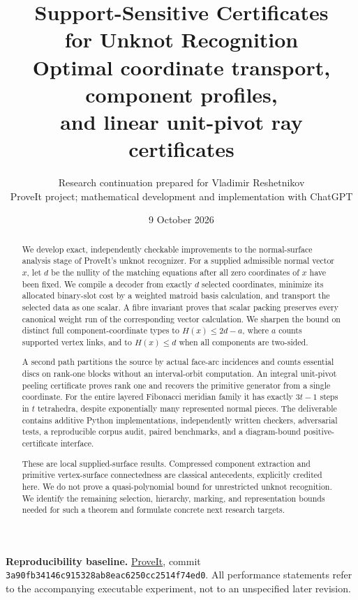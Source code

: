 \documentclass[11pt,a4paper]{article}
\title{\textcolor{ink}{Support-Sensitive Certificates\\for Unknot Recognition}\\[6pt]
 \large Optimal coordinate transport, component profiles,\\and linear unit-pivot ray certificates}
\author{Research continuation prepared for Vladimir Reshetnikov\\
 \small ProveIt project; mathematical development and implementation with ChatGPT}
\date{9 October 2026}
\theoremstyle{definition}
\newcommand{\code}[1]{{\small\nolinkurl{#1}}}
\begin{document}
\maketitle
\begin{abstract}
We develop exact, independently checkable improvements to the normal-surface
analysis stage of ProveIt's unknot recognizer.  For a supplied admissible normal
vector $x$, let $d$ be the nullity of the matching equations after all zero
coordinates of $x$ have been fixed.  We compile a decoder from exactly $d$
selected coordinates, minimize its allocated binary-slot cost by a weighted
matroid basis calculation, and transport the selected data as one scalar.
A fibre invariant proves that scalar packing preserves every canonical weight
run of the corresponding vector calculation.  We sharpen the bound on distinct
full component-coordinate types to $H(x)\le 2d-a$, where $a$ counts supported
vertex links, and to $H(x)\le d$ when all components are two-sided.

A second path partitions the source by actual face-arc incidences and counts
essential discs on rank-one blocks without an interval-orbit computation.
An integral unit-pivot peeling certificate proves rank one and recovers the
primitive generator from a single coordinate.  For the entire layered
Fibonacci meridian family it has exactly $3t-1$ steps in $t$ tetrahedra,
despite exponentially many represented normal pieces.  The deliverable
contains additive Python implementations, independently written checkers,
adversarial tests, a reproducible corpus audit, paired benchmarks, and a
diagram-bound positive-certificate interface.

These are local supplied-surface results.  Compressed component extraction and
primitive vertex-surface connectedness are classical antecedents, explicitly
credited here.  We do not prove a quasi-polynomial bound for unrestricted unknot
recognition.  We identify the remaining selection, hierarchy, marking, and
representation bounds needed for such a theorem and formulate concrete next
research targets.
\end{abstract}

\vspace{4pt}
\noindent\textbf{Reproducibility baseline.}
\href{https://github.com/VladimirReshetnikov/ProveIt/tree/3a90fb34146c915328ab8eac6250cc2514f74ed0/Topology/UnknotRecognition}{ProveIt},
commit \code{3a90fb34146c915328ab8eac6250cc2514f74ed0}.
All performance statements refer to the accompanying executable experiment,
not to an unspecified later revision.
\end{document}
